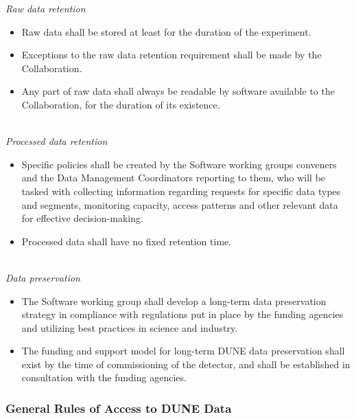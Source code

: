 \textit{Raw data retention}
\begin{itemize}
\item Raw data shall be stored at least for the duration of the experiment.

\item Exceptions to the raw data retention requirement shall be made by the Collaboration.

\item Any part of raw data shall always be readable by software available to the Collaboration, for the duration of its existence.

\end{itemize}
\ 
\\
\textit{Processed data retention}
\begin{itemize}
\item Specific policies shall be created by the Software working groups conveners and the Data Management Coordinators reporting to them, who will be tasked with collecting information regarding requests for specific data types and segments, monitoring capacity, access patterns and other relevant data for effective decision-making. 

\item Processed data shall have no fixed retention time.
\end{itemize}
\ 
\\
\textit{Data preservation}
\label{sec:dunepres}
\begin{itemize}
\item The Software working group shall develop a long-term data preservation strategy in compliance with regulations put in place by the funding agencies and utilizing best practices in science and industry.

\item The funding and support model for long-term DUNE data preservation shall exist by the time of commissioning of the detector, and shall be established in consultation with the funding agencies.
\end{itemize}

\subsubsection{General Rules of Access to DUNE Data}

